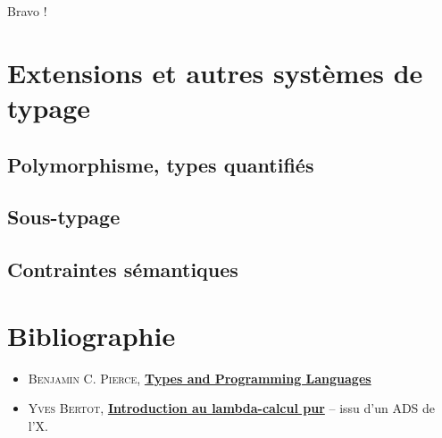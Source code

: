 \documentclass[11pt]{article}
\begin{document}
Bravo !

\section{Extensions et autres systèmes de typage}
\subsection{Polymorphisme, types quantifiés}
\subsection{Sous-typage}
\subsection{Contraintes sémantiques}

\newpage
\section*{Bibliographie}
\begin{itemize}
    \item {\scshape{Benjamin C. Pierce}}, \href{https://www.cis.upenn.edu/~bcpierce/tapl/}{\textbf{Types and Programming Languages}}
    \item {\scshape{Yves Bertot}}, \href{https://www-sop.inria.fr/members/Yves.Bertot/courses/lambda-pur.pdf}{\textbf{Introduction au lambda-calcul pur}} -- issu d'un ADS de l'X.
\end{itemize}
\end{document}
